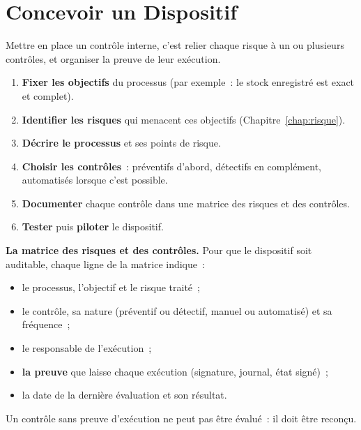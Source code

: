 \section{Concevoir un Dispositif}
\label{sec:c02-concevoir}

Mettre en place un contrôle interne, c'est relier chaque risque à un ou
plusieurs contrôles, et organiser la preuve de leur exécution.

\begin{enumerate}
    \item \textbf{Fixer les objectifs} du processus (par exemple~: le stock
          enregistré est exact et complet).
    \item \textbf{Identifier les risques} qui menacent ces objectifs
          (Chapitre~\ref{chap:risque}).
    \item \textbf{Décrire le processus} et ses points de risque.
    \item \textbf{Choisir les contrôles}~: préventifs d'abord, détectifs en
          complément, automatisés lorsque c'est possible.
    \item \textbf{Documenter} chaque contrôle dans une matrice des risques
          et des contrôles.
    \item \textbf{Tester} puis \textbf{piloter} le dispositif.
\end{enumerate}

\begin{boxprocedure}
\textbf{La matrice des risques et des contrôles.} Pour que le dispositif soit
auditable, chaque ligne de la matrice indique~:
\begin{itemize}
    \item le processus, l'objectif et le risque traité~;
    \item le contrôle, sa nature (préventif ou détectif, manuel ou
          automatisé) et sa fréquence~;
    \item le responsable de l'exécution~;
    \item \textbf{la preuve} que laisse chaque exécution (signature,
          journal, état signé)~;
    \item la date de la dernière évaluation et son résultat.
\end{itemize}
Un contrôle sans preuve d'exécution ne peut pas être évalué~: il doit être
reconçu.
\end{boxprocedure}

